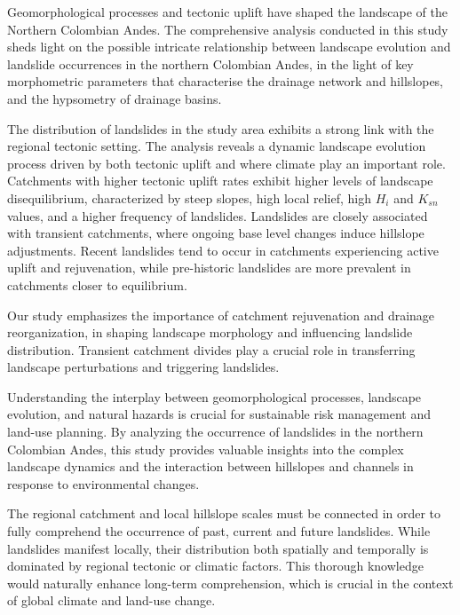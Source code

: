 \documentclass[draft]{agujournal2019}
\begin{document}
\par Geomorphological processes and tectonic uplift have shaped the landscape of the Northern Colombian Andes. The comprehensive analysis conducted in this study sheds light on the possible intricate relationship between landscape evolution and landslide occurrences in the northern Colombian Andes, in the light of key morphometric parameters that characterise the drainage network and hillslopes, and the hypsometry of drainage basins.

\par The distribution of landslides in the study area exhibits a strong link with the regional tectonic setting. The analysis reveals a dynamic landscape evolution process driven by both tectonic uplift and where climate play an important role. Catchments with higher tectonic uplift rates exhibit higher levels of landscape disequilibrium, characterized by steep slopes, high local relief, high $H_i$ and $K_{sn}$ values, and a higher frequency of landslides. Landslides are closely associated with transient catchments, where ongoing base level changes induce hillslope adjustments. Recent landslides tend to occur in catchments experiencing active uplift and rejuvenation, while pre-historic landslides are more prevalent in catchments closer to equilibrium.  

\par Our study emphasizes the importance of catchment rejuvenation and drainage reorganization, in shaping landscape morphology and influencing landslide distribution. Transient catchment divides play a crucial role in transferring landscape perturbations and triggering landslides.  

\par Understanding the interplay between geomorphological processes, landscape evolution, and natural hazards is crucial for sustainable risk management and land-use planning. By analyzing the occurrence of landslides in the northern Colombian Andes, this study provides valuable insights into the complex landscape dynamics and the interaction between hillslopes and channels in response to environmental changes. 

\par The regional catchment and local hillslope scales must be connected in order to fully comprehend the occurrence of past, current and future landslides. While landslides manifest locally, their distribution both spatially and temporally is dominated by regional tectonic or climatic factors. This thorough knowledge would naturally enhance long-term comprehension, which is crucial in the context of global climate and land-use change.
\end{document}
